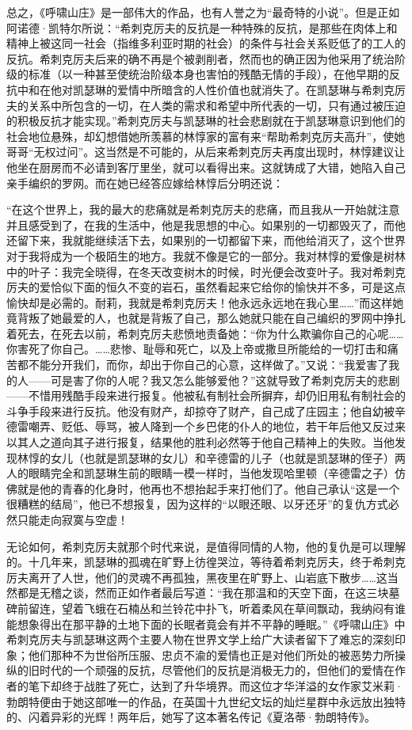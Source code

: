 \par 总之，《呼啸山庄》是一部伟大的作品，也有人誉之为“最奇特的小说”。但是正如阿诺德·凯特尔所说：“希刺克厉夫的反抗是一种特殊的反抗，是那些在肉体上和精神上被这同一社会（指维多利亚时期的社会）的条件与社会关系贬低了的工人的反抗。希刺克厉夫后来的确不再是个被剥削者，然而也的确正因为他采用了统治阶级的标准（以一种甚至使统治阶级本身也害怕的残酷无情的手段），在他早期的反抗中和在他对凯瑟琳的爱情中所暗含的人性价值也就消失了。在凯瑟琳与希刺克厉夫的关系中所包含的一切，在人类的需求和希望中所代表的一切，只有通过被压迫的积极反抗才能实现。”希刺克厉夫与凯瑟琳的社会悲剧就在于凯瑟琳意识到他们的社会地位悬殊，却幻想借她所羡慕的林惇家的富有来“帮助希刺克厉夫高升”，使她哥哥“无权过问”。这当然是不可能的，从后来希刺克厉夫再度出现时，林惇建议让他坐在厨房而不必请到客厅里坐，就可以看得出来。这就铸成了大错，她陷入自己亲手编织的罗网。而在她已经答应嫁给林惇后分明还说：
\par “在这个世界上，我的最大的悲痛就是希刺克厉夫的悲痛，而且我从一开始就注意并且感受到了，在我的生活中，他是我思想的中心。如果别的一切都毁灭了，而他还留下来，我就能继续活下去，如果别的一切都留下来，而他给消灭了，这个世界对于我将成为一个极陌生的地方。我就不像是它的一部分。我对林惇的爱像是树林中的叶子：我完全晓得，在冬天改变树木的时候，时光便会改变叶子。我对希刺克厉夫的爱恰似下面的恒久不变的岩石，虽然看起来它给你的愉快并不多，可是这点愉快却是必需的。耐莉，我就是希刺克厉夫！他永远永远地在我心里……”而这样她竟背叛了她最爱的人，也就是背叛了自己，那么她就只能在自己编织的罗网中挣扎着死去，在死去以前，希刺克厉夫悲愤地责备她：“你为什么欺骗你自己的心呢……你害死了你自己。……悲惨、耻辱和死亡，以及上帝或撒旦所能给的一切打击和痛苦都不能分开我们，而你，却出于你自己的心意，这样做了。”又说：“我爱害了我的人——可是害了你的人呢？我又怎么能够爱他？”这就导致了希刺克厉夫的悲剧——不惜用残酷手段来进行报复。他被私有制社会所摒弃，却仍旧用私有制社会的斗争手段来进行反抗。他没有财产，却掠夺了财产，自己成了庄园主；他自幼被辛德雷嘲弄、贬低、辱骂，被人降到一个乡巴佬的仆人的地位，若干年后他又反过来以其人之道向其子进行报复，结果他的胜利必然等于他自己精神上的失败。当他发现林惇的女儿（也就是凯瑟琳的女儿）和辛德雷的儿子（也就是凯瑟琳的侄子）两人的眼睛完全和凯瑟琳生前的眼睛一模一样时，当他发现哈里顿（辛德雷之子）仿佛就是他的青春的化身时，他再也不想抬起手来打他们了。他自己承认“这是一个很糟糕的结局”，他已不想报复，因为这样的“以眼还眼、以牙还牙”的复仇方式必然只能走向寂寞与空虚！
\par 无论如何，希刺克厉夫就那个时代来说，是值得同情的人物，他的复仇是可以理解的。十几年来，凯瑟琳的孤魂在旷野上彷徨哭泣，等待着希刺克厉夫，终于希刺克厉夫离开了人世，他们的灵魂不再孤独，黑夜里在旷野上、山岩底下散步……这当然都是无稽之谈，然而正如作者最后写道：“我在那温和的天空下面，在这三块墓碑前留连，望着飞蛾在石楠丛和兰铃花中扑飞，听着柔风在草间飘动，我纳闷有谁能想象得出在那平静的土地下面的长眠者竟会有并不平静的睡眠。”《呼啸山庄》中希刺克厉夫与凯瑟琳这两个主要人物在世界文学上给广大读者留下了难忘的深刻印象；他们那种不为世俗所压服、忠贞不渝的爱情也正是对他们所处的被恶势力所操纵的旧时代的一个顽强的反抗，尽管他们的反抗是消极无力的，但他们的爱情在作者的笔下却终于战胜了死亡，达到了升华境界。而这位才华洋溢的女作家艾米莉·勃朗特便由于她这部唯一的作品，在英国十九世纪文坛的灿烂星群中永远放出独特的、闪着异彩的光辉！两年后，她写了这本著名传记《夏洛蒂·勃朗特传》。


